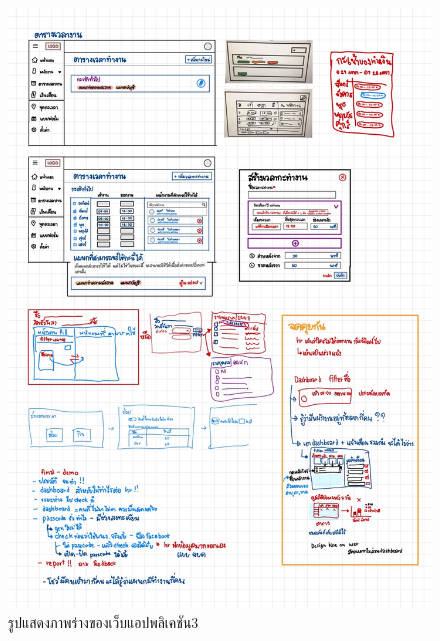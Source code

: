 \begin{figure}
  \begin{center}
    \includegraphics[width=14cm,keepaspectratio]{./images/design5.jpg}
  \end{center}
  \caption[รูปแสดงภาพร่างของเว็บแอปพลิเคชัน3]{รูปแสดงภาพร่างของเว็บแอปพลิเคชัน3} 
  
\end{figure}

